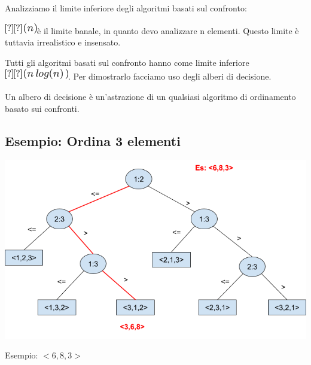 \documentclass{article}
\begin{document}
{{}

{Analizziamo il limite inferiore degli algoritmi basati sul confronto:}

\includegraphics{images/image149.png}{è il limite banale, in quanto devo analizzare n elementi. Questo limite è tuttavia irrealistico e insensato.}

{}

{Tutti gli algoritmi basati sul confronto hanno come limite inferiore
}\includegraphics{images/image153.png}{. Per dimostrarlo facciamo uso
degli }{alberi di decisione.}

{}

{Un albero di decisione è un'astrazione di un qualsiasi algoritmo di ordinamento basato sui confronti.}

\hypertarget{h.oynrnvh2y1cp}{\subsection{\texorpdfstring{{Esempio:
Ordina 3 elementi}}{Esempio: Ordina 3 elementi}}\label{h.oynrnvh2y1cp}}

{}

{\includegraphics{images/image531.png}}

Esempio: $<6,8,3>$


}
\end{document}
